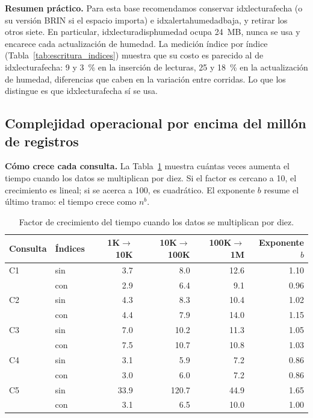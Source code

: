 \documentclass[11pt,letterpaper]{article}
\newcommand{\tbus}{\textunderscore\allowbreak}
\newcommand{\tb}[1]{{\ttfamily\let\_\tbus #1}}
\begin{document}
\textbf{Resumen práctico.} Para esta base recomendamos conservar \tb{idx\_lectura\_fecha} (o su versión BRIN si el espacio importa) e \tb{idx\_alerta\_humedad\_baja}, y retirar los otros siete. En particular, \tb{idx\_lectura\_disp\_humedad} ocupa 24~MB, nunca se usa y encarece cada actualización de humedad. La medición índice por índice (Tabla~\ref{tab:escritura_indices}) muestra que su costo es parecido al de \tb{idx\_lectura\_fecha}: 9 y 3~\% en la inserción de lecturas, 25 y 18~\% en la actualización de humedad, diferencias que caben en la variación entre corridas. Lo que los distingue es que \tb{idx\_lectura\_fecha} sí se usa.

\subsection{Complejidad operacional por encima del millón de registros}
\label{sec:extra}

\textbf{Cómo crece cada consulta.} La Tabla~\ref{tab:crecimiento} muestra cuántas veces aumenta el tiempo cuando los datos se multiplican por diez. Si el factor es cercano a 10, el crecimiento es lineal; si se acerca a 100, es cuadrático. El exponente $b$ resume el último tramo: el tiempo crece como $n^b$.

\begin{table}[H]
\centering\small
\begin{tabular}{llrrrr}
\toprule
Consulta & Índices & 1K$\to$10K & 10K$\to$100K & 100K$\to$1M & Exponente $b$ \\
\midrule
C1 & sin & 3.7 & 8.0 & 12.6 & 1.10 \\
 & con & 2.9 & 6.4 & 9.1 & 0.96 \\
C2 & sin & 4.3 & 8.3 & 10.4 & 1.02 \\
 & con & 4.4 & 7.9 & 14.0 & 1.15 \\
C3 & sin & 7.0 & 10.2 & 11.3 & 1.05 \\
 & con & 7.5 & 10.7 & 10.8 & 1.03 \\
C4 & sin & 3.1 & 5.9 & 7.2 & 0.86 \\
 & con & 3.0 & 6.0 & 7.2 & 0.86 \\
C5 & sin & 33.9 & 120.7 & 44.9 & 1.65 \\
 & con & 3.1 & 6.5 & 10.0 & 1.00 \\
\bottomrule
\end{tabular}
\caption{Factor de crecimiento del tiempo cuando los datos se multiplican por diez.}\label{tab:crecimiento}
\end{table}
\end{document}
